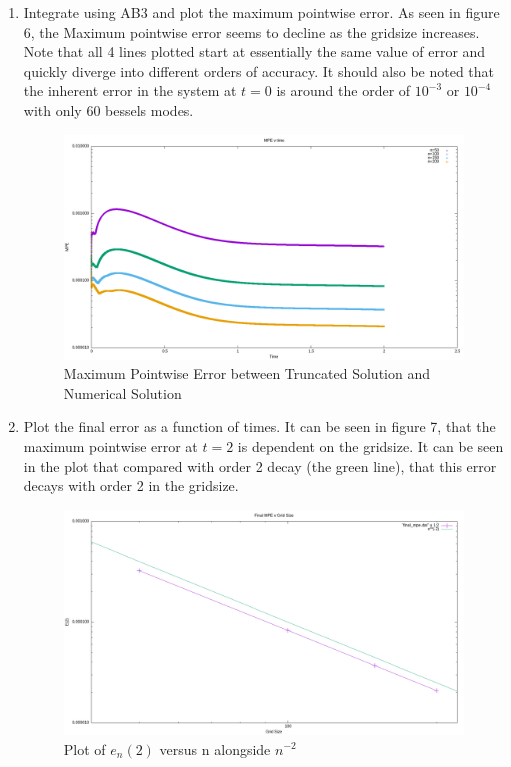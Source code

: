 \documentclass{article}
\begin{document}
\begin{enumerate}[label=\alph*)]
    \item Integrate using AB3 and plot the maximum pointwise error. As seen in
    figure 6, the Maximum pointwise error seems to decline as the gridsize
    increases. Note that all 4 lines plotted start at essentially the same value
    of error and quickly diverge into different orders of accuracy. It should
    also be noted that the inherent error in the system at $t = 0$ is around the order of
    $10^{-3}$ or $10^{-4}$ with only 60 bessels modes.
        \begin{figure}[ht]
            \centering
            \includegraphics[width=.8\textwidth]{mpe.png}
            \caption{Maximum Pointwise Error between Truncated Solution and
            Numerical Solution}
        \end{figure}

    \item Plot the final error as a function of times. It can be seen in figure
    7, that the maximum pointwise error at $t = 2$ is dependent on the gridsize.
    It can be seen in the plot that compared with order 2 decay (the green
    line), that this error decays with order 2 in the gridsize. 
        \begin{figure}[ht]
            \centering
            \includegraphics[width=.8\textwidth]{final_mpe.png}
            \caption{Plot of $e_n(2)$ versus n alongside $n^{-2}$}
        \end{figure}


\end{enumerate}
\end{document}
